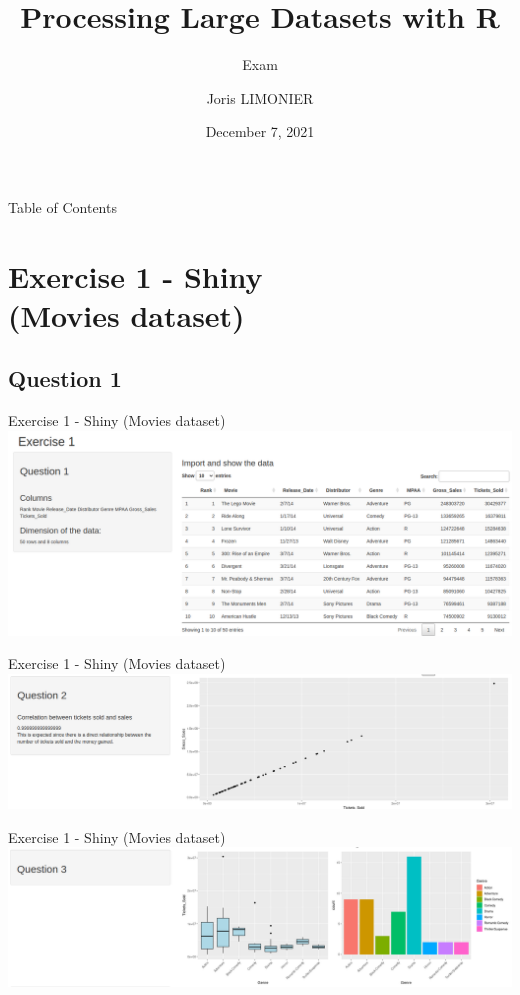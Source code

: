 \documentclass{beamer}
\title{Processing Large Datasets with R}
\subtitle{Exam}
\author{\large Joris LIMONIER}
\date{December 7, 2021}
\begin{document}

\maketitle

\begin{frame}{Table of Contents}
    \tableofcontents
\end{frame}

\section{Exercise 1 - Shiny\\(Movies dataset)}
\subsection{Question 1}

\begin{frame}{Exercise 1 - Shiny (Movies dataset)}
    \includegraphics[width=\textwidth]{img/ex1_q1.png}
\end{frame}

\begin{frame}{Exercise 1 - Shiny (Movies dataset)}
    \includegraphics[width=\textwidth]{img/ex1_q2.png}
\end{frame}

\begin{frame}{Exercise 1 - Shiny (Movies dataset)}
    \includegraphics[width=\textwidth]{img/ex1_q3.png}
\end{frame}
\end{document}
